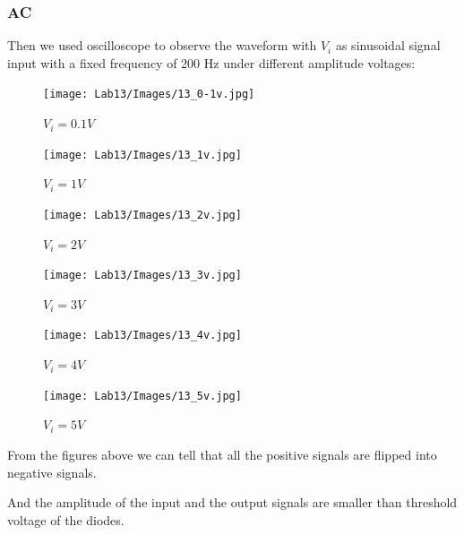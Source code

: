     \subsubsection{AC}
    Then we used oscilloscope to observe the waveform with $V_i$ as sinusoidal signal input with a fixed frequency of 200 Hz under different amplitude voltages:\par
        \begin{figure}[h]
            \centering
            \texttt{[image: Lab13/Images/13\_0-1v.jpg]}
            \caption{$V_i=0.1V$}
            \label{l13vi01v}
        \end{figure}
        \FloatBarrier
        \begin{figure}[h]
            \centering
            \texttt{[image: Lab13/Images/13\_1v.jpg]}
            \caption{$V_i=1V$}
            \label{l13vi1v}
        \end{figure}
        \FloatBarrier
        \begin{figure}[h]
            \centering
            \texttt{[image: Lab13/Images/13\_2v.jpg]}
            \caption{$V_i=2V$}
            \label{l13vi2v}
        \end{figure}
        \FloatBarrier
        \begin{figure}[h]
            \centering
            \texttt{[image: Lab13/Images/13\_3v.jpg]}
            \caption{$V_i=3V$}
            \label{l13vi3v}
        \end{figure}
        \FloatBarrier
        \begin{figure}[h]
            \centering
            \texttt{[image: Lab13/Images/13\_4v.jpg]}
            \caption{$V_i=4V$}
            \label{l13vi4v}
        \end{figure}
        \FloatBarrier
        \begin{figure}[h]
            \centering
            \texttt{[image: Lab13/Images/13\_5v.jpg]}
            \caption{$V_i=5V$}
            \label{l13vi5v}
        \end{figure}
        \FloatBarrier
    From the figures above we can tell that all the positive signals are flipped into negative signals.\par
    And the amplitude of the input and the output signals are smaller than threshold voltage of the diodes.\par
